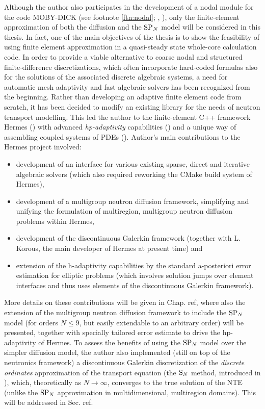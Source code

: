Although the author also participates in the development of a nodal module for the code MOBY-DICK (see footnote
\ref{ftn:nodal}; \cite{Hanus2}, \cite[Chap. 4]{Hanus3}), only the finite-element approximation of both the diffusion and
the $\text{SP}_{N}$ model will be considered in this thesis. In fact, one of the main objectives of the thesis is to show the
feasibility of using finite element approximation in a quasi-steady state whole-core calculation code. In order to
provide a viable alternative to coarse nodal and structured finite-difference discretizations, which often incorporate
hard-coded formulas also for the solutions of the associated discrete algebraic systems, a need for automatic mesh
adaptivity and fast algebraic solvers has been recognized from the beginning. Rather than developing an adaptive finite
element code from scratch, it has been decided to modify an existing library for the needs of neutron transport
modelling. This led the author to the finite-element C++ framework Hermes (\cite{Hermes-project}) with advanced
\textit{hp-adaptivity} capabilities (\cite{Hermes-hanging-nodes}) and a unique way of assembling coupled systems of PDEs (\cite{Hermes-thermoelasticity}).
Author's main contributions to the Hermes project involved:
\begin{itemize}
    \item development of an interface for various existing sparse,
direct and iterative algebraic solvers (which also required reworking the CMake build system of Hermes),
	\item development of a multigroup neutron diffusion framework, simplifying and unifying the formulation of
	multiregion, multigroup neutron diffusion problems within Hermes,
	\item development of the discontinuous Galerkin framework (together with L. Korous, the main developer of Hermes at
	present time) and
	\item extension of the h-adaptivity capabilities by the standard a-posteriori error estimation for elliptic problems (which
involves solution jumps over element interfaces and thus uses elements of the discontinuous Galerkin framework). 
\end{itemize}
More details on these contributions will be given in Chap. \alert{ref}, where also the extension of the multigroup
neutron diffusion framework to include the $\text{SP}_{N}$ model (for orders $N \leq 9$, but easily extendable to an arbitrary
order) will be presented, together with specially tailored error estimate to drive the hp-adaptivity of Hermes. To
assess the benefits of using the $\text{SP}_{N}$ model over the simpler diffusion model, the author also implemented (still on
top of the neutronics framework) a discontinuous Galerkin discretization of the \textit{discrete ordinates}
approximation of the transport equation (the $\text{S}_{N}$ method, introduced in ), which, theoretically as $N\to\infty$, converges to the true solution of
the NTE (unlike the $\text{SP}_{N}$ approximation in multidimensional, multiregion domains). This will be addressed in Sec.
\alert{ref}.

